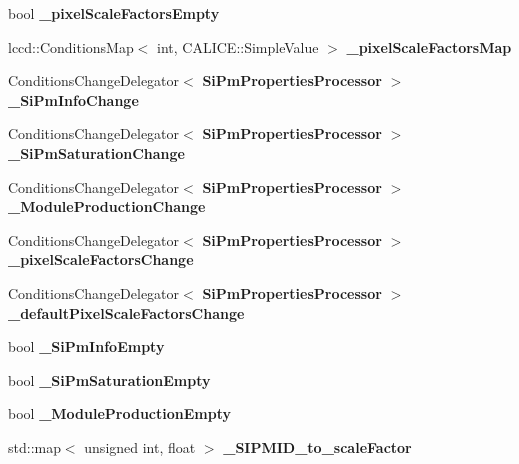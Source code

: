 \begin{DoxyCompactItemize}
\item 
bool {\bfseries \_\-pixelScaleFactorsEmpty}\label{classCALICE_1_1SiPmPropertiesProcessor_ad0f2dd1b49e6ce68019984f64ca5e994}

\item 
lccd::ConditionsMap$<$ int, CALICE::SimpleValue $>$ {\bfseries \_\-pixelScaleFactorsMap}\label{classCALICE_1_1SiPmPropertiesProcessor_a00f1e01ad1c585c5fa33ff048ad3e17a}

\item 
ConditionsChangeDelegator$<$ {\bf SiPmPropertiesProcessor} $>$ {\bfseries \_\-SiPmInfoChange}\label{classCALICE_1_1SiPmPropertiesProcessor_abfa2958127c2f592a9cf1861bf6f8b8a}

\item 
ConditionsChangeDelegator$<$ {\bf SiPmPropertiesProcessor} $>$ {\bfseries \_\-SiPmSaturationChange}\label{classCALICE_1_1SiPmPropertiesProcessor_afffde1d70dd6fc1d52b50f12c13de3ef}

\item 
ConditionsChangeDelegator$<$ {\bf SiPmPropertiesProcessor} $>$ {\bfseries \_\-ModuleProductionChange}\label{classCALICE_1_1SiPmPropertiesProcessor_a0d2cbe6dab804d78d8eb27a8f3af787f}

\item 
ConditionsChangeDelegator$<$ {\bf SiPmPropertiesProcessor} $>$ {\bfseries \_\-pixelScaleFactorsChange}\label{classCALICE_1_1SiPmPropertiesProcessor_a11a48bdf9a5840d090ef9047b03fcfd4}

\item 
ConditionsChangeDelegator$<$ {\bf SiPmPropertiesProcessor} $>$ {\bfseries \_\-defaultPixelScaleFactorsChange}\label{classCALICE_1_1SiPmPropertiesProcessor_ace4d68c1d75ec060bc60a8ba69014dc1}

\item 
bool {\bfseries \_\-SiPmInfoEmpty}\label{classCALICE_1_1SiPmPropertiesProcessor_adba4eeb5243a0fd5198ab9ffb0979998}

\item 
bool {\bfseries \_\-SiPmSaturationEmpty}\label{classCALICE_1_1SiPmPropertiesProcessor_acb305e30ef61ea06ee84d4188d51aeaf}

\item 
bool {\bfseries \_\-ModuleProductionEmpty}\label{classCALICE_1_1SiPmPropertiesProcessor_a24b9c0152d25707562bca6f25335cbfe}

\item 
std::map$<$ unsigned int, float $>$ {\bfseries \_\-SIPMID\_\-to\_\-scaleFactor}\label{classCALICE_1_1SiPmPropertiesProcessor_ab54d5d21a513778cf3e3f4553f5be538}


\end{DoxyCompactItemize}
